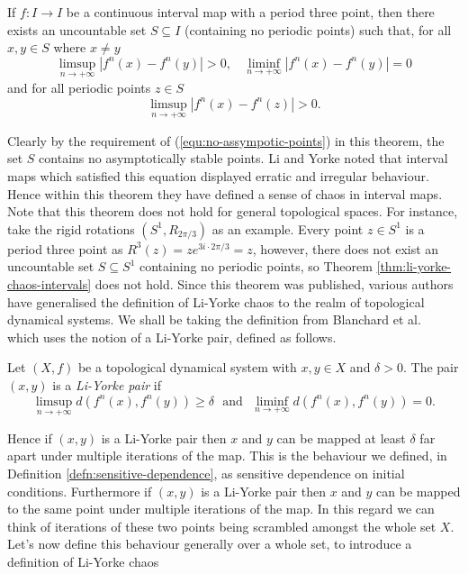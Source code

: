 \begin{thm} \label{thm:li-yorke-chaos-intervals}
    If $f: I \to I$ be a continuous interval map with a period three point, then there exists an uncountable set $S \subseteq I$ (containing no periodic points) such that, for all $x, y \in S$ where $x \neq y$
    \[\limsup_{n \to +\infty}\left\lvert f^n(x) - f^n(y) \right\rvert > 0, \ \ \ \ \liminf_{n \to +\infty}\left\lvert f^n(x) - f^n(y) \right\rvert = 0\] and for all periodic points $z \in S$ \begin{equation} \label{equ:no-assympotic-points}\limsup_{n \to +\infty}\left\lvert f^n(x) - f^n(z) \right\rvert > 0.\end{equation}
\end{thm}

Clearly by the requirement of (\ref{equ:no-assympotic-points}) in this theorem, the set $S$ contains no asymptotically stable points. Li and Yorke noted that interval maps which satisfied this equation displayed erratic and irregular behaviour. Hence within this theorem they have defined a sense of chaos in interval maps. Note that this theorem does not hold for general topological spaces. For instance, take the rigid rotations $(S^1, R_{2\pi/3})$ as an example. Every point $z \in S^1$ is a period three point as $R^3(z) = ze^{3i \cdot 2\pi/3} = z$, however, there does not exist an uncountable set $S \subseteq S^1$ containing no periodic points, so Theorem \ref{thm:li-yorke-chaos-intervals} does not hold. Since this theorem was published, various authors have generalised the definition of Li-Yorke chaos to the realm of topological dynamical systems. We shall be taking the definition from Blanchard et al.\ \cite{bgsm} which uses the notion of a Li-Yorke pair, defined as follows.

\begin{defn} \label{defn:li-yorke-pair}
    Let $(X, f)$ be a topological dynamical system with $x, y \in X$ and $\delta > 0$. The pair $(x, y)$ is a \emph{Li-Yorke pair} if \[\limsup_{n \to +\infty} d\left( f^n(x), f^n(y) \right) \geq \delta \ \ \ \text{and} \ \ \ \liminf_{n\to+\infty} d\left( f^n(x), f^n(y) \right) = 0.\]
\end{defn}

Hence if $(x, y)$ is a Li-Yorke pair then $x$ and $y$ can be mapped at least $\delta$ far apart under multiple iterations of the map. This is the behaviour we defined, in Definition \ref{defn:sensitive-dependence}, as sensitive dependence on initial conditions. Furthermore if $(x, y)$ is a Li-Yorke pair then $x$ and $y$ can be mapped to the same point under multiple iterations of the map. In this regard we can think of iterations of these two points being scrambled amongst the whole set $X$. Let's now define this behaviour generally over a whole set, to introduce a definition of Li-Yorke chaos

